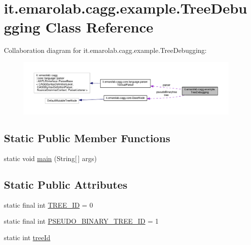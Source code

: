 \hypertarget{classit_1_1emarolab_1_1cagg_1_1example_1_1TreeDebugging}{\section{it.\-emarolab.\-cagg.\-example.\-Tree\-Debugging Class Reference}
\label{classit_1_1emarolab_1_1cagg_1_1example_1_1TreeDebugging}
}


Collaboration diagram for it.\-emarolab.\-cagg.\-example.\-Tree\-Debugging\-:\nopagebreak
\begin{figure}[H]
\begin{center}
\leavevmode
\includegraphics[width=350pt]{classit_1_1emarolab_1_1cagg_1_1example_1_1TreeDebugging__coll__graph}
\end{center}
\end{figure}
\subsection*{Static Public Member Functions}
\begin{DoxyCompactItemize}
\item 
static void \hyperlink{classit_1_1emarolab_1_1cagg_1_1example_1_1TreeDebugging_a6c1ede5ccc64d7ff7da9fb3ef9da6be0}{main} (String\mbox{[}$\,$\mbox{]} args)
\end{DoxyCompactItemize}
\subsection*{Static Public Attributes}
\begin{DoxyCompactItemize}
\item 
static final int \hyperlink{classit_1_1emarolab_1_1cagg_1_1example_1_1TreeDebugging_a11915e335bec1cc59bc2e6a783210974}{T\-R\-E\-E\-\_\-\-I\-D} = 0
\item 
static final int \hyperlink{classit_1_1emarolab_1_1cagg_1_1example_1_1TreeDebugging_aa136547f95cfb433835d9b498b8c8f50}{P\-S\-E\-U\-D\-O\-\_\-\-B\-I\-N\-A\-R\-Y\-\_\-\-T\-R\-E\-E\-\_\-\-I\-D} = 1
\item 
static int \hyperlink{classit_1_1emarolab_1_1cagg_1_1example_1_1TreeDebugging_a659d21489843ad5089694905e946d8ef}{tree\-Id}
\end{DoxyCompactItemize}
